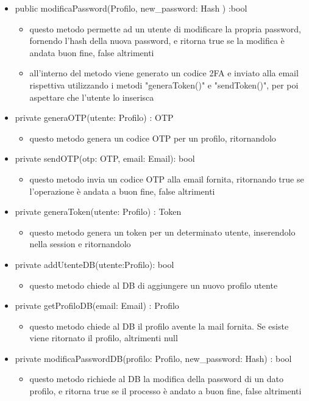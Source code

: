 \documentclass{report}
\begin{document}
\begin{itemize}
\begin{itemize}
		\end{itemize}
	\item public modificaPassword(Profilo, new\_password: Hash ) :bool
		\begin{itemize}
			\item questo metodo permette ad un utente di modificare la propria password, fornendo l'hash della nuova password, e ritorna true se la modifica è andata buon fine, false altrimenti
			\item all'interno del metodo viene generato un codice 2FA e inviato alla email rispettiva utilizzando i metodi "generaToken()" e "sendToken()", per poi aspettare che l'utente lo inserisca
		\end{itemize}
	\item private generaOTP(utente: Profilo) : OTP
		\begin{itemize}
			\item questo metodo genera un codice OTP per un profilo, ritornandolo 
		\end{itemize}
	\item private sendOTP(otp: OTP, email: Email): bool
		\begin{itemize}
			\item questo metodo invia un codice OTP alla email fornita, ritornando true se l'operazione è andata a buon fine, false altrimenti
		\end{itemize}
	\item private generaToken(utente: Profilo) : Token
		\begin{itemize}
			\item questo metodo genera un token per un determinato utente, inserendolo nella session e ritornandolo
		\end{itemize}
	\item private addUtenteDB(utente:Profilo): bool
		\begin{itemize}
			\item questo metodo chiede al DB di aggiungere un nuovo profilo utente 
		\end{itemize}
	\item private getProfiloDB(email: Email) : Profilo
		\begin{itemize}
			\item questo metodo chiede al DB il profilo avente la mail fornita. Se esiste viene ritornato il profilo, altrimenti null
		\end{itemize}
	\item private modificaPasswordDB(profilo: Profilo, new\_password: Hash) : bool
		\begin{itemize}
			\item questo metodo richiede al DB la modifica della password di un dato profilo, e ritorna true se il processo è andato a buon fine, false altrimenti
		\end{itemize}
\end{itemize}
\end{document}
